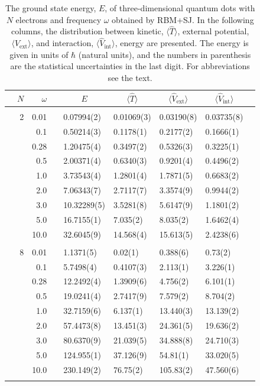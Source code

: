 \begin{table}[H]
	\caption{The ground state energy, $E$, of three-dimensional quantum dots with $N$ electrons and frequency $\omega$ obtained by RBM+SJ. In the following columns, the distribution between kinetic, $\langle\hat{T}\rangle$, external potential, $\langle\hat{V}_{\text{ext}}\rangle$, and interaction, $\langle\hat{V}_{\text{int}}\rangle$, energy are presented. The energy is given in units of $\hbar$ (natural units), and the numbers in parenthesis are the statistical uncertainties in the last digit. For abbreviations see the text.}
	\label{tab:splitfrequencyQDRBMSJ3D}
	\begin{tabularx}{\textwidth}{R{1cm}rrcR{2.3cm}R{2.3cm}R{2.3cm}R{2.3cm}R{1cm}} \hline\hline
		\makecell{\\ \phantom{$N$}} & $N$ & $\omega$ &&  &  &  &  \\ \hline \\
		&2 & 0.01 && 0.07994(2) & 0.01069(3) & 0.03190(8) & 0.03735(8) \\
		&& 0.1 && 0.50214(3) & 0.1178(1) & 0.2177(2) & 0.1666(1) \\
		&& 0.28 && 1.20475(4) & 0.3497(2) & 0.5326(3) & 0.3225(1) \\
		&& 0.5 && 2.00371(4) & 0.6340(3) & 0.9201(4) & 0.4496(2) \\
		&& 1.0 && 3.73543(4) & 1.2801(4) & 1.7871(5) & 0.6683(2) \\
		&& 2.0 && 7.06343(7) & 2.7117(7) & 3.3574(9) & 0.9944(2) \\
		&& 3.0 && 10.32289(5) & 3.5281(8) & 5.6147(9) & 1.1801(2) \\ 
		&& 5.0 && 16.7155(1) & 7.035(2) & 8.035(2) & 1.6462(4) \\
		&& 10.0 && 32.6045(9) & 14.568(4) & 15.613(5) & 2.4238(6) \\
		\hline \\
		
		&8 & 0.01 && 1.1371(5) & 0.02(1) & 0.388(6) & 0.73(2) \\
		&& 0.1 && 5.7498(4) & 0.4107(3) & 2.113(1) & 3.226(1) \\
		&& 0.28 && 12.2492(4) & 1.3909(6) & 4.756(2) & 6.101(1) \\
		&& 0.5 && 19.0241(4) & 2.7417(9) & 7.579(2) & 8.704(2) \\
		&& 1.0 && 32.7159(6) & 6.137(1) & 13.440(3) & 13.139(2) \\
		&& 2.0 && 57.4473(8) & 13.451(3) & 24.361(5) & 19.636(2) \\
		&& 3.0 && 80.6370(9) & 21.039(5) & 34.888(8) & 24.710(3) \\ 
		&& 5.0 && 124.955(1) & 37.126(9) & 54.81(1) & 33.020(5) \\
		&& 10.0 && 230.149(2) & 76.75(2) & 105.83(2) & 47.560(6) \\
		\hline \\
		

\end{tabularx}
\end{table}

